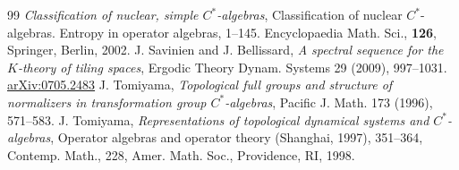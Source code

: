 \documentclass[11pt]{article}
\theoremstyle{definition}
\begin{document}
\begin{thebibliography}{99}
\textit{Classification of nuclear, simple $C^*$-algebras}, 
Classification of nuclear $C^*$-algebras. Entropy in operator algebras, 
1--145. 
Encyclopaedia Math. Sci., \textbf{126}, Springer, Berlin, 2002. 
J. Savinien and J. Bellissard, 
\textit{A spectral sequence for the $K$-theory of tiling spaces}, 
Ergodic Theory Dynam. Systems 29 (2009), 997--1031. 
\href{http://arxiv.org/abs/0705.2483}{arXiv:0705.2483}
J. Tomiyama, 
\textit{Topological full groups and structure of normalizers 
in transformation group $C^*$-algebras}, 
Pacific J. Math. 173 (1996), 571--583. 
J. Tomiyama, 
\textit{Representations of topological dynamical systems and $C^*$-algebras}, 
Operator algebras and operator theory (Shanghai, 1997), 351--364, 
Contemp. Math., 228, Amer. Math. Soc., Providence, RI, 1998. 
\end{thebibliography}
\end{document}

